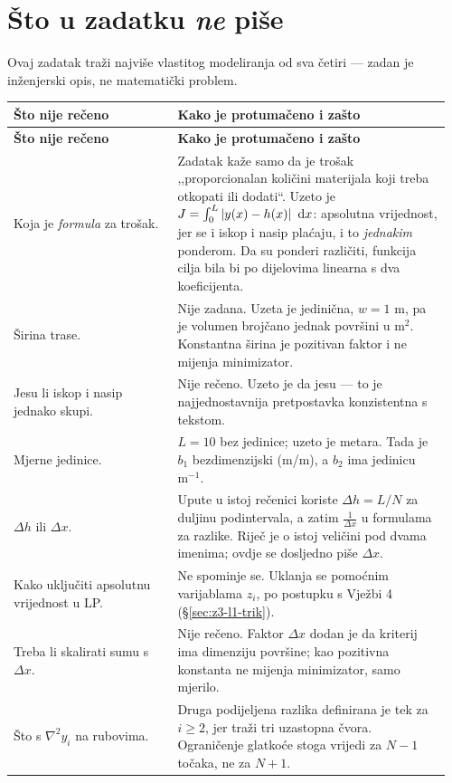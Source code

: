 \section{Što u zadatku \emph{ne} piše}
\label{sec:z3-nije-receno}

Ovaj zadatak traži najviše vlastitog modeliranja od sva četiri --- zadan je
inženjerski opis, ne matematički problem.

\begin{longtable}{@{}p{0.36\linewidth} p{0.60\linewidth}@{}}
\toprule
\textbf{Što nije rečeno} & \textbf{Kako je protumačeno i zašto} \\
\midrule
\endfirsthead
\toprule
\textbf{Što nije rečeno} & \textbf{Kako je protumačeno i zašto} \\
\midrule
\endhead
Koja je \emph{formula} za trošak. & Zadatak kaže samo da je trošak
,,proporcionalan količini materijala koji treba otkopati ili dodati``. Uzeto je
$J = \int_0^L \left\lvert y(x) - h(x) \right\rvert\,\,\mathrm{d} x$: apsolutna vrijednost, jer se i iskop i
nasip plaćaju, i to \emph{jednakim} ponderom. Da su ponderi različiti, funkcija
cilja bila bi po dijelovima linearna s dva koeficijenta. \\[6pt]
Širina trase. & Nije zadana. Uzeta je jedinična, $w = 1$ m, pa je volumen
brojčano jednak površini u $\mathrm{m}^2$. Konstantna širina je pozitivan faktor
i ne mijenja minimizator. \\[6pt]
Jesu li iskop i nasip jednako skupi. & Nije rečeno. Uzeto je da jesu --- to je
najjednostavnija pretpostavka konzistentna s tekstom. \\[6pt]
Mjerne jedinice. & $L = 10$ bez jedinice; uzeto je metara. Tada je $b_1$
bezdimenzijski (m/m), a $b_2$ ima jedinicu $\mathrm{m}^{-1}$. \\[6pt]
$\Delta h$ ili $\Delta x$. & Upute u istoj rečenici koriste $\Delta h = L/N$ za
duljinu podintervala, a zatim $\frac{1}{\Delta x}$ u formulama za razlike. Riječ
je o istoj veličini pod dvama imenima; ovdje se dosljedno piše $\Delta x$. \\[6pt]
Kako uključiti apsolutnu vrijednost u LP. & Ne spominje se. Uklanja se
pomoćnim varijablama $z_i$, po postupku s Vježbi 4
(\S\ref{sec:z3-l1-trik}). \\[6pt]
Treba li skalirati sumu s $\Delta x$. & Nije rečeno. Faktor $\Delta x$ dodan je
da kriterij ima dimenziju površine; kao pozitivna konstanta ne mijenja
minimizator, samo mjerilo. \\[6pt]
Što s $\nabla^2 y_i$ na rubovima. & Druga podijeljena razlika definirana je tek
za $i \geq 2$, jer traži tri uzastopna čvora. Ograničenje glatkoće stoga vrijedi
za $N-1$ točaka, ne za $N+1$. \\
\bottomrule
\end{longtable}

